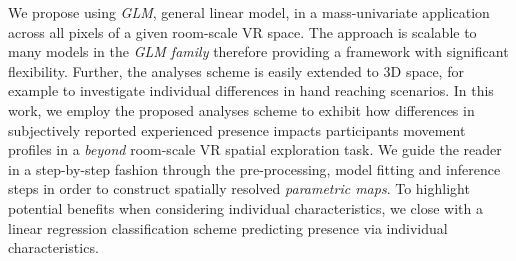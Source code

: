 We propose using \textit{GLM}, general linear model, in a mass-univariate application across all pixels of a given room-scale VR space. The approach is scalable to many models in the \textit{GLM family} therefore providing a framework with significant flexibility. Further, the analyses scheme is easily extended to 3D space, for example to investigate individual differences in hand reaching scenarios. In this work, we employ the proposed analyses scheme to exhibit how differences in subjectively reported experienced presence impacts participants movement profiles in a \textit{beyond} room-scale VR spatial exploration task. We guide the reader in a step-by-step fashion through the pre-processing, model fitting and inference steps in order to construct spatially resolved \textit{parametric maps}. To highlight potential benefits when considering individual characteristics, we close with a linear regression classification scheme predicting presence via individual characteristics.

